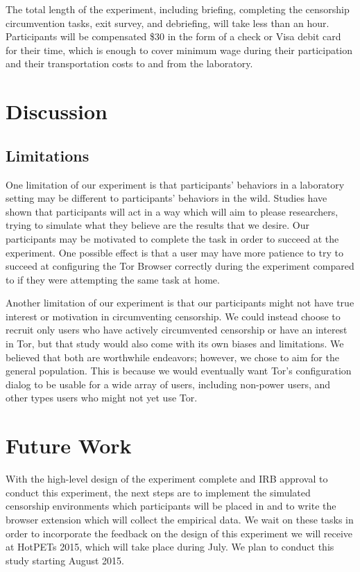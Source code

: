 \documentclass[letterpaper,twocolumn,11pt]{article}
\begin{document}
The total length of the experiment, including briefing, completing the censorship circumvention tasks, 
exit survey, and debriefing, will take less than an hour. Participants will be compensated \$30 in the form
of a check or Visa debit card for their time, which is enough to cover minimum wage during their participation 
and their transportation costs to and from the laboratory. 

\section{Discussion} 

\subsection{Limitations}
\indent \indent One limitation of our experiment is that participants' behaviors in a laboratory setting may
be different to participants' behaviors in the wild. Studies have shown that participants will act in a way which 
will aim to please researchers, trying to simulate what they believe are the results that we desire. Our participants
may be motivated to complete the task in order to succeed at the experiment. One possible effect is that a user
may have more patience to try to succeed at configuring the Tor Browser correctly during the experiment 
compared to if they were attempting the same task at home. 

Another limitation of our experiment is that our participants might not have true interest or motivation in
circumventing censorship. We could instead choose to recruit only users who have actively circumvented
censorship or have an interest in Tor, but that study would also come with its own biases and limitations.
We believed that both are worthwhile endeavors; however, we chose to aim for the general population. 
This is because we would eventually want Tor's configuration dialog to be usable for a wide array of users, 
including non-power users, and other types users who might not yet use Tor. 

\section{Future Work}
\indent \indent With the high-level design of the experiment complete and IRB approval  to conduct this
experiment,  the next steps are to implement the simulated censorship environments which participants 
will be placed in and to write the browser extension which will collect the empirical data. 
We wait on these tasks in order to incorporate the feedback on the design of this experiment 
we will receive at HotPETs 2015, which will take place during July. We plan to conduct this study starting 
August 2015. 
\end{document}
